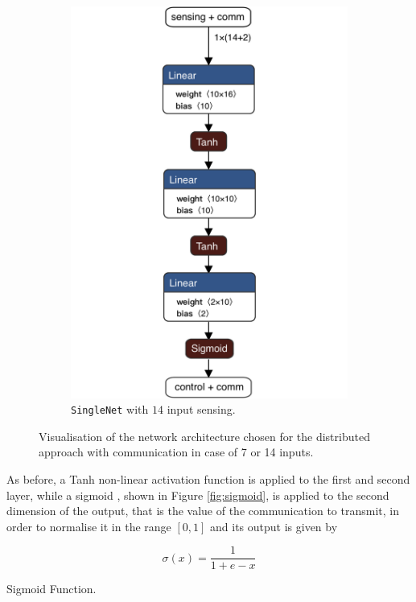 \begin{figure}[!htb]
\begin{subfigure}[h]{0.495\textwidth}
		\includegraphics[width=.8\textwidth]{contents/images/task1distributed_allcomm@4x}
		\caption{\texttt{SingleNet} with $14$ input sensing.}
	\end{subfigure}
	\caption[Network architectures for the distributed approach with 
	communication.]{Visualisation of the network architecture chosen for the 
	distributed approach with communication in case of 7 or 14 inputs.}
	\label{fig:singlenetcomm1}
\end{figure}

As before, a Tanh non-linear activation function is applied to the first and second 
layer, while a sigmoid \cite[see][]{han1995influence}, shown in Figure 
\ref{fig:sigmoid}, is applied to the second dimension of the output, that is the 
value of the communication to transmit, in order to normalise it in the range $[0, 
1]$ and its output is given by
\begin{Equation}[H]
	\centering
	\begin{equation}
	\sigma(x)= \frac{1}{1 + e - x}
	\end{equation}
	\caption{Sigmoid Function.}
	\label{eq:sigmoid}
\end{Equation}

